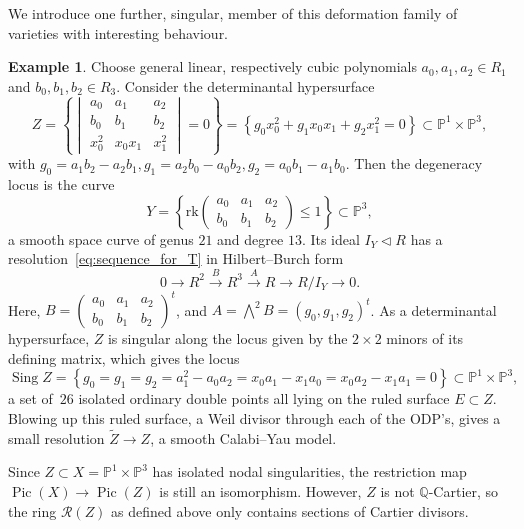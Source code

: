 \documentclass[a4paper,11pt]{amsart}
\theoremstyle{plain}
\theoremstyle{definition}
\newtheorem{example}[theorem]{Example}
\newcommand{\p}{\mathbb{P}}
\newcommand{\Q}{\mathbb{Q}}
\newcommand{\R}{\mathcal{R}}
\DeclareMathOperator{\Pic}{Pic}
\newcommand{\pic}{\Pic}
\begin{document}
We introduce one further, singular, member of this deformation family of varieties with interesting behaviour.

\begin{example} \label{ex:det} Choose general linear, respectively cubic polynomials $a_0,a_1,a_2\in R_1$ and 
$b_0,b_1,b_2\in R_3$. Consider the determinantal hypersurface
\[
Z = \left\{\begin{vmatrix}a_0 & a_1& a_2 \\ b_0 & b_1& b_2 \\ x_0^2 & x_0x_1 & x_1^2\end{vmatrix}=0\right\}
=\left\{g_0x_0^2  +g_1x_0x_1 +g_2 x_1^2 = 0\right\} \subset\p^1\times \p^3,\]
with $g_0=a_1b_2-a_2b_1, g_1=a_2b_0-a_0b_2, g_2=a_0b_1-a_1b_0$. 
Then the degeneracy locus is the curve
\[
Y = \left\{{\mathrm{rk}}\begin{pmatrix}a_0 & a_1& a_2 \\ b_0 & b_1& b_2 \end{pmatrix}\leq 1\right\}
 \subset \p^3,\]
a smooth space curve of genus $21$ and degree $13$. Its ideal $I_Y\lhd R$ has a resolution~\eqref{eq:sequence_for_T} in Hilbert--Burch form
 \begin{equation}0 \longrightarrow R^{2}\stackrel{B}\longrightarrow R^{3}\stackrel{A}\longrightarrow R \longrightarrow R/I_Y\longrightarrow 0.\end{equation}
Here, $B=\begin{pmatrix}a_0 & a_1& a_2 \\ b_0 & b_1& b_2 \end{pmatrix}^t$,  
and $A=\bigwedge^2 B = (g_0, g_1, g_2)^t$. As a determinantal hypersurface, $Z$ is singular along the locus given by the $2\times 2$ minors of its defining matrix, which gives the locus 
\[
\mathop\mathrm{Sing} Z=\left\{g_0=g_1=g_2=a_1^2-a_0a_2=x_0a_1-x_1a_0=x_0a_2-x_1a_1=0\right\}\subset \p^1\times \p^3,
\]
a set of~$26$ isolated ordinary double points all lying on the ruled surface $E\subset Z$. Blowing up this ruled surface, a Weil divisor through each of the ODP's, gives a small resolution $\widetilde Z\rightarrow Z$, a smooth Calabi--Yau model. 

Since $Z\subset X=\p^1\times\p^3$ has isolated nodal singularities, the restriction map $\pic(X)\to\pic(Z)$ is still an isomorphism. 
However, $Z$ is not $\Q$-Cartier, so the ring $\R(Z)$ as defined above only contains sections of Cartier divisors.


\end{example}
\end{document}
